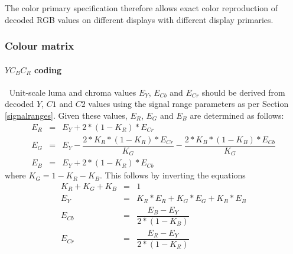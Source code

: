 \begin{informative*}
The color primary specification therefore allows exact color reproduction of
 decoded RGB values on different displays
with different display primaries.

\subsubsection{Colour matrix}
\label{matrix}
\paragraph{$YC_BC_R$ coding}
$\ $\newline
Unit-scale luma and chroma values $E_Y$, $E_{Cb}$ and $E_{Cr}$ should be
derived from decoded $Y$, $C1$ and $C2$ values using the signal range parameters
as per Section \ref{signalranges}. Given these values, $E_R$, $E_G$ and $E_B$ are
determined as follows:
\begin{eqnarray*}
E_R & = & E_Y + 2*(1-K_R)*E_{Cr} \\
E_G & = & E_Y - \dfrac{2*K_R*(1-K_R)*E_{Cr}}{K_G}-\dfrac{2*K_B*(1-K_B)*E_{Cb}}{K_G} \\
E_B & = & E_Y + 2*(1-K_R)*E_{Cb} 
\end{eqnarray*}
where $K_G=1-K_R-K_B$.
This follows by inverting the equations 
\begin{eqnarray*}
K_R+K_G+K_B & = & 1 \\
E_Y & = & K_R*E_R+K_G*E_G+K_B*E_B \\
E_{Cb} & = & \dfrac{E_B - E_Y}{2*(1-K_B)} \\
E_{Cr} & = & \dfrac{E_R - E_Y}{2*(1-K_R)} \\
\end{eqnarray*}


\end{informative*}
